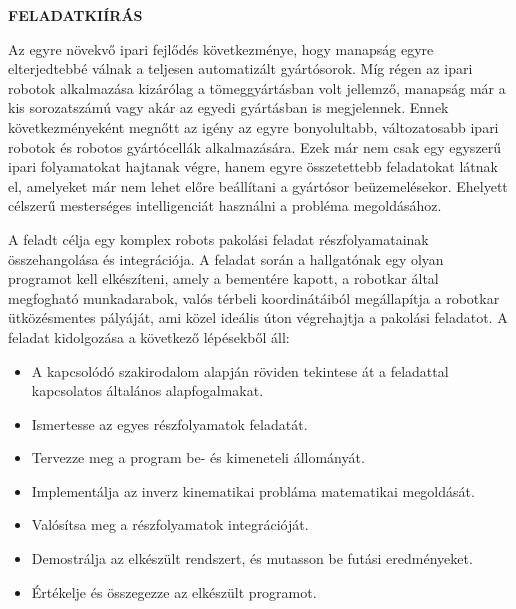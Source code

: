 \clearpage
\begin{center}
\large
\textbf{FELADATKIÍRÁS}\\
\end{center}


Az egyre növekvő ipari fejlődés következménye, hogy manapság egyre elterjedtebbé
válnak a teljesen automatizált gyártósorok. Míg régen az ipari robotok alkalmazása
kizárólag a tömeggyártásban volt jellemző, manapság már a kis sorozatszámú vagy akár
az egyedi gyártásban is megjelennek. Ennek következményeként megnőtt az igény az
egyre bonyolultabb, változatosabb ipari robotok és robotos gyártócellák alkalmazására.
Ezek már nem csak egy egyszerű ipari folyamatokat hajtanak végre, hanem egyre
összetettebb feladatokat látnak el, amelyeket már nem lehet előre beállítani a gyártósor
beüzemelésekor. Ehelyett célszerű mesterséges intelligenciát használni a probléma
megoldásához.

A feladt célja egy komplex robots pakolási feladat részfolyamatainak összehangolása és integrációja.
A feladat során a hallgatónak egy olyan programot kell elkészíteni, amely a bementére kapott,
a robotkar által megfogható munkadarabok, valós térbeli koordinátáiból megállapítja a robotkar 
ütközésmentes pályáját, ami közel ideális úton végrehajtja a pakolási feladatot. 
A feladat kidolgozása a következő lépésekből áll:

\begin{itemize}
    \item A kapcsolódó szakirodalom alapján röviden tekintese át a feladattal kapcsolatos általános alapfogalmakat.
    \item Ismertesse az egyes részfolyamatok feladatát.
    \item Tervezze meg a program be- és kimeneteli állományát.
    \item Implementálja az inverz kinematikai probláma matematikai megoldását.
    \item Valósítsa meg a részfolyamatok integrációját.
    \item Demostrálja az elkészült rendszert, és mutasson be futási eredményeket.
    \item Értékelje és összegezze az elkészült programot.
\end{itemize}